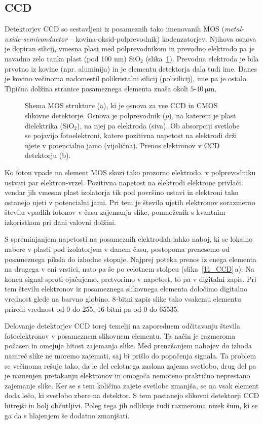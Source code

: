 \subsection*{CCD}
Detektorjev CCD so sestavljeni iz posameznih tako imenovanih MOS ({\it metal-oxide-semiconductor}
-- kovina-oksid-polprevodnik) kodenzatorjev. Njihova osnova je dopiran silicij, vmesna 
plast med polprevodnikom in prevodno elektrodo pa je navadno zelo tanka plast (pod 100 nm)
SiO$_2$ (slika~\ref{11_MOS}).
Prevodna elektroda je bila prvotno iz kovine (npr. aluminija) in je elementu detektorja dala tudi ime.
Danes je kovino večinoma nadomestil polikristalni silicij (polisilicij), ime pa je ostalo.
Tipična dolžina stranice posameznega elementa znaša okoli $5$-$40~\si{\micro\meter}$. 
\begin{figure}[h]
\centering
\def\svgwidth{140truemm} 

\caption{Shema MOS strukture (a), ki je osnova za vse CCD in CMOS slikovne detektorje. Osnova je 
polprevodnik ($p$), na katerem je plast dielektrika (SiO$_2$), na njej pa elektroda (siva). 
Ob absorpciji svetlobe se pojavijo fotoelektroni, katere pozitivna napetost
na elektrodi drži ujete v potencialno jamo (vijolična). Prenos elektronov v CCD detektorju (b).}
\label{11_MOS}
\end{figure}

Ko foton vpade na element MOS skozi tako prozorno elektrodo, v polprevodniku ustvari
par elektron-vrzel. Pozitivna napetost na elektrodi elektrone privlači, vendar jih 
vmesna plast izolatorja tik pod površino ustavi in elektroni tako ostanejo ujeti v potencialni jami. 
Pri tem je število ujetih elektronov sorazmerno številu vpadlih fotonov v času zajemanja slike, 
pomnoženih s kvantnim izkoristkom pri dani valovni dolžini. 

S spreminjanjem napetosti na posameznih elektrodah lahko naboj, ki se lokalno nabere 
v plasti pod izolatorjem v danem času, postopoma prenesemo od posameznega 
piksla do izhodne stopnje. Najprej poteka prenos iz enega elementa na drugega v eni vrstici, 
nato pa še po celotnem stolpcu (slika~\ref{11_CCD}\,a). Na koncu signal sproti ojačujemo, 
pretvorimo v napetost, to pa v digitalni zapis. Pri tem številu elektronov iz posameznega
slikovnega elementa določimo digitalno vrednost glede na barvno globino. 8-bitni zapis slike
tako vsakemu elementu priredi vrednost od 0 do 255, 16-bitni pa od 0 do 65535.

Delovanje detektorjev CCD torej temelji na zaporednem odčitavanju števila fotoelektronov v posameznem 
slikovnem elementu. Ta način je razmeroma počasen in omejuje hitost zajemanja slike. Med 
prenašanjem nabojev do izhoda namreč slike ne moremo zajemati, saj bi prišlo do popačenja signala. 
Ta problem se večinoma rešuje tako, da le del celotnega zaslona zajema svetlobo, drug del
pa je namenjen pretakanju elektronov in omogoča nemoteno praktično neprestano zajemanje slike.
Ker se s tem količina zajete svetlobe zmanjša, se na vsak element doda lečo, ki svetlobo zbere
na detektor. S tem postanejo slikovni detektorji CCD hitrejši in bolj občutljivi. Poleg
tega jih odlikuje tudi razmeroma nizek šum, ki se ga da s hlajenjem še dodatno 
zmanjšati. 

